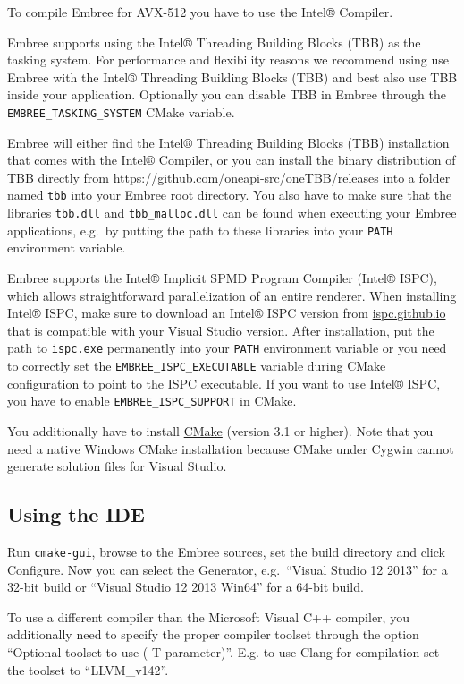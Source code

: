 To compile Embree for AVX-512 you have to use the Intel® Compiler.

Embree supports using the Intel® Threading Building Blocks (TBB) as the
tasking system. For performance and flexibility reasons we recommend
using use Embree with the Intel® Threading Building Blocks (TBB) and
best also use TBB inside your application. Optionally you can disable
TBB in Embree through the \texttt{EMBREE\_TASKING\_SYSTEM} CMake
variable.

Embree will either find the Intel® Threading Building Blocks (TBB)
installation that comes with the Intel® Compiler, or you can install the
binary distribution of TBB directly from
\url{https://github.com/oneapi-src/oneTBB/releases} into a folder named
\texttt{tbb} into your Embree root directory. You also have to make sure
that the libraries \texttt{tbb.dll} and \texttt{tbb\_malloc.dll} can be
found when executing your Embree applications, e.g.~by putting the path
to these libraries into your \texttt{PATH} environment variable.

Embree supports the Intel® Implicit SPMD Program Compiler (Intel® ISPC),
which allows straightforward parallelization of an entire renderer. When
installing Intel® ISPC, make sure to download an Intel® ISPC version
from \href{https://ispc.github.io/downloads.html}{ispc.github.io} that
is compatible with your Visual Studio version. After installation, put
the path to \texttt{ispc.exe} permanently into your \texttt{PATH}
environment variable or you need to correctly set the
\texttt{EMBREE\_ISPC\_EXECUTABLE} variable during CMake configuration to
point to the ISPC executable. If you want to use Intel® ISPC, you have
to enable \texttt{EMBREE\_ISPC\_SUPPORT} in CMake.

You additionally have to install
\href{http://www.cmake.org/download/}{CMake} (version 3.1 or higher).
Note that you need a native Windows CMake installation because CMake
under Cygwin cannot generate solution files for Visual Studio.

\subsection{Using the IDE}\label{using-the-ide}

Run \texttt{cmake-gui}, browse to the Embree sources, set the build
directory and click Configure. Now you can select the Generator,
e.g.~``Visual Studio 12 2013'' for a 32-bit build or ``Visual Studio 12
2013 Win64'' for a 64-bit build.

To use a different compiler than the Microsoft Visual C++ compiler, you
additionally need to specify the proper compiler toolset through the
option ``Optional toolset to use (-T parameter)''. E.g. to use Clang for
compilation set the toolset to ``LLVM\_v142''.

